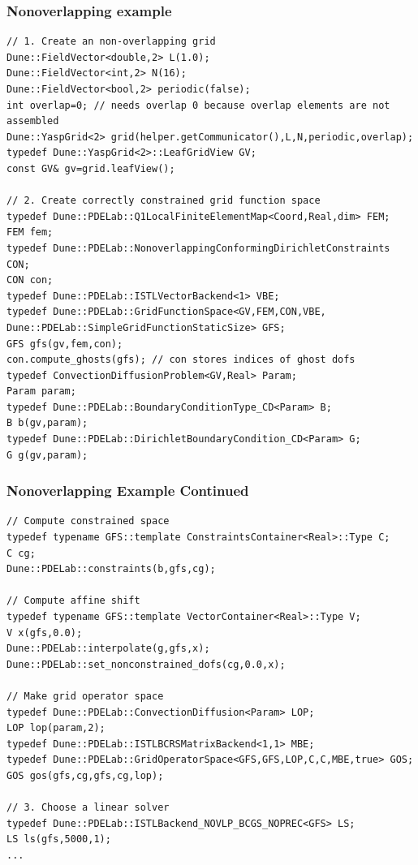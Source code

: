 \begin{frame}[fragile]
  \frametitle{Nonoverlapping example}
  \begin{lstlisting}[basicstyle=\tiny]
// 1. Create an non-overlapping grid
Dune::FieldVector<double,2> L(1.0);
Dune::FieldVector<int,2> N(16);
Dune::FieldVector<bool,2> periodic(false);
int overlap=0; // needs overlap 0 because overlap elements are not assembled
Dune::YaspGrid<2> grid(helper.getCommunicator(),L,N,periodic,overlap);
typedef Dune::YaspGrid<2>::LeafGridView GV;
const GV& gv=grid.leafView();

// 2. Create correctly constrained grid function space
typedef Dune::PDELab::Q1LocalFiniteElementMap<Coord,Real,dim> FEM;
FEM fem;
typedef Dune::PDELab::NonoverlappingConformingDirichletConstraints CON;
CON con;
typedef Dune::PDELab::ISTLVectorBackend<1> VBE;
typedef Dune::PDELab::GridFunctionSpace<GV,FEM,CON,VBE,
Dune::PDELab::SimpleGridFunctionStaticSize> GFS;
GFS gfs(gv,fem,con);
con.compute_ghosts(gfs); // con stores indices of ghost dofs
typedef ConvectionDiffusionProblem<GV,Real> Param;
Param param;
typedef Dune::PDELab::BoundaryConditionType_CD<Param> B;
B b(gv,param);
typedef Dune::PDELab::DirichletBoundaryCondition_CD<Param> G;
G g(gv,param);
\end{lstlisting}
\end{frame}
\begin{frame}[fragile]
\frametitle<presentation>{Nonoverlapping Example Continued}
  \begin{lstlisting}[basicstyle=\tiny]
// Compute constrained space
typedef typename GFS::template ConstraintsContainer<Real>::Type C;
C cg;
Dune::PDELab::constraints(b,gfs,cg);

// Compute affine shift
typedef typename GFS::template VectorContainer<Real>::Type V;
V x(gfs,0.0);
Dune::PDELab::interpolate(g,gfs,x);
Dune::PDELab::set_nonconstrained_dofs(cg,0.0,x);

// Make grid operator space
typedef Dune::PDELab::ConvectionDiffusion<Param> LOP; 
LOP lop(param,2);
typedef Dune::PDELab::ISTLBCRSMatrixBackend<1,1> MBE;
typedef Dune::PDELab::GridOperatorSpace<GFS,GFS,LOP,C,C,MBE,true> GOS;
GOS gos(gfs,cg,gfs,cg,lop);

// 3. Choose a linear solver 
typedef Dune::PDELab::ISTLBackend_NOVLP_BCGS_NOPREC<GFS> LS;
LS ls(gfs,5000,1);
...
\end{lstlisting}
  
\end{frame}

